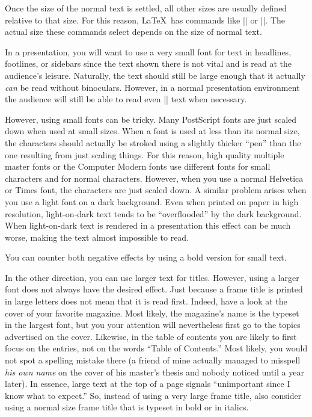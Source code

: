 Once the size of the normal text is settled, all other sizes are usually defined relative to that size. For this reason, \LaTeX\ has commands like |\large| or |\small|. The actual size these commands select depends on the size of normal text.

In a presentation, you will want to use a very small font for text in headlines, footlines, or sidebars since the text shown there is not vital and is read at the audience's leisure. Naturally, the text should still be large enough that it actually \emph{can} be read without binoculars. However, in a normal presentation environment the audience will still be able to read even |\tiny| text when necessary.

However, using small fonts can be tricky. Many PostScript fonts are just scaled down when used at small sizes. When a font is used at less than its normal size, the characters should actually be stroked using a slightly thicker ``pen'' than the one resulting from just scaling things. For this reason, high quality multiple master fonts or the Computer Modern fonts use different fonts for small characters and for normal characters. However, when you use a normal Helvetica or Times font, the characters are just scaled down. A similar problem arises when you use a light font on a dark background. Even when printed on paper in high resolution, light-on-dark text tends to be ``overflooded'' by the dark background. When light-on-dark text is rendered in a presentation this effect can be much worse, making the text almost impossible to read.

You can counter both negative effects by using a bold version for small text.

In the other direction, you can use larger text for titles. However, using a larger font does not always have the desired effect. Just because a frame title is printed in large letters does not mean that it is read first. Indeed, have a look at the cover of your favorite magazine. Most likely, the magazine's name is the typeset in the largest font, but you your attention will nevertheless first go to the topics advertised on the cover. Likewise, in the table of contents you are likely to first focus on the entries, not on the words ``Table of Contents.'' Most likely, you would not spot a spelling mistake there (a friend of mine actually managed to misspell \emph{his own name} on the cover of his master's thesis and nobody noticed until a year later). In essence, large text at the top of a page signals ``unimportant since I know what to expect.'' So, instead of using a very large frame title, also consider using a normal size frame title that is typeset in bold or in italics.

